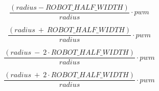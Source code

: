 \documentclass[10pt]{book}
\begin{document}
\begin{mdSnippets}
\begin{mdDisplaySnippet}[e8cafa34b9965bc9800090f872756b30]
\end{mdDisplaySnippet}%
\begin{mdDisplaySnippet}%
\begin{mdDiv}[class={mathdisplay,math-display},color={},math-needpdf={}]%
\[%
\frac{(radius - ROBOT\_HALF\_WIDTH)} {radius} \cdot pwm
\]%
\end{mdDiv}%

\end{mdDisplaySnippet}%
\begin{mdDisplaySnippet}[7e3088bf66eceaede9e261a0e20f7f24]%
\begin{mdDiv}[class={mathdisplay,math-display},color={},math-needpdf={}]%
\[%
\frac{(radius \ + \ ROBOT\_HALF\_WIDTH)} {radius} \cdot pwm
\]%
\end{mdDiv}%

\end{mdDisplaySnippet}%
\begin{mdDisplaySnippet}[5693098578fd89ace3564983fe147102]%
\begin{mdDiv}[class={mathdisplay,math-display},color={},math-needpdf={}]%
\[%
\frac{(radius \ - \ 2 \cdot ROBOT\_HALF\_WIDTH)} {radius} \cdot pwm
\]%
\end{mdDiv}%

\end{mdDisplaySnippet}%
\begin{mdDisplaySnippet}[524327b7ef66984f15e0d023603e4f2c]%
\begin{mdDiv}[class={mathdisplay,math-display},color={},math-needpdf={}]%
\[%
\frac{(radius \ + \ 2 \cdot ROBOT\_HALF\_WIDTH)} {radius} \cdot pwm
\]%
\end{mdDiv}%


\end{mdDisplaySnippet}
\end{mdSnippets}
\end{document}

